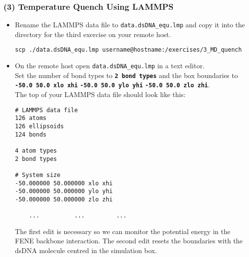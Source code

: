 \documentclass[slidestop,compress,9pt]{beamer}
\begin{document}
\begin{frame}[fragile]
\frametitle{(3) Temperature Quench Using LAMMPS}

\small

\begin{itemize}
\item Rename the LAMMPS data file to \texttt{data.dsDNA\_equ.lmp} and copy it into the directory for the third exercise on your remote host.

\begin{lstlisting}
scp ./data.dsDNA_equ.lmp username@hostname:/exercises/3_MD_quench
\end{lstlisting}

\item On the remote host open \texttt{data.dsDNA\_equ.lmp} in a text editor.\\
Set the number of bond types to \textbf{\texttt{2 bond types}} and the box boundaries to\\
\textbf{\texttt{-50.0 50.0 xlo xhi}} \textbf{\texttt{-50.0 50.0 ylo yhi}}
\textbf{\texttt{-50.0 50.0 zlo zhi}}.\\
The top of your LAMMPS data file should look like this:
\linespread{0.4}
\begin{lstlisting}
# LAMMPS data file
126 atoms
126 ellipsoids
124 bonds

4 atom types
2 bond types

# System size
-50.000000 50.000000 xlo xhi
-50.000000 50.000000 ylo yhi
-50.000000 50.000000 zlo zhi

    ...          ...         ... 
\end{lstlisting}
The first edit is necessary so we can monitor the potential energy in the FENE backbone interaction. The second edit resets the boundaries with the dsDNA molecule centred in the simulation box.

\end{itemize}

\end{frame}
\end{document}
